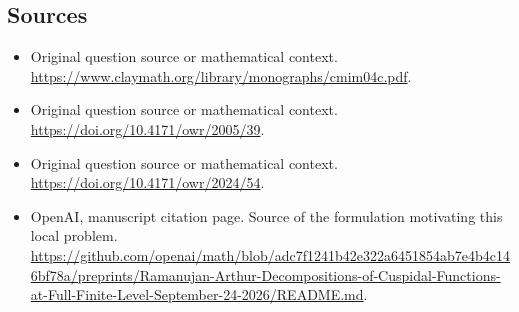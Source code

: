 \documentclass[11pt]{article}
\begin{document}
\subsection{Sources}
\begin{itemize}
\item[S1] Original question source or mathematical context.
\url{https://www.claymath.org/library/monographs/cmim04c.pdf}.
\item[S2] Original question source or mathematical context.
\url{https://doi.org/10.4171/owr/2005/39}.
\item[S3] Original question source or mathematical context.
\url{https://doi.org/10.4171/owr/2024/54}.
\item[S4] OpenAI, manuscript citation page. Source of the formulation motivating this local problem.
\url{https://github.com/openai/math/blob/adc7f1241b42e322a6451854ab7e4b4c146bf78a/preprints/Ramanujan-Arthur-Decompositions-of-Cuspidal-Functions-at-Full-Finite-Level-September-24-2026/README.md}.
\end{itemize}
\end{document}
